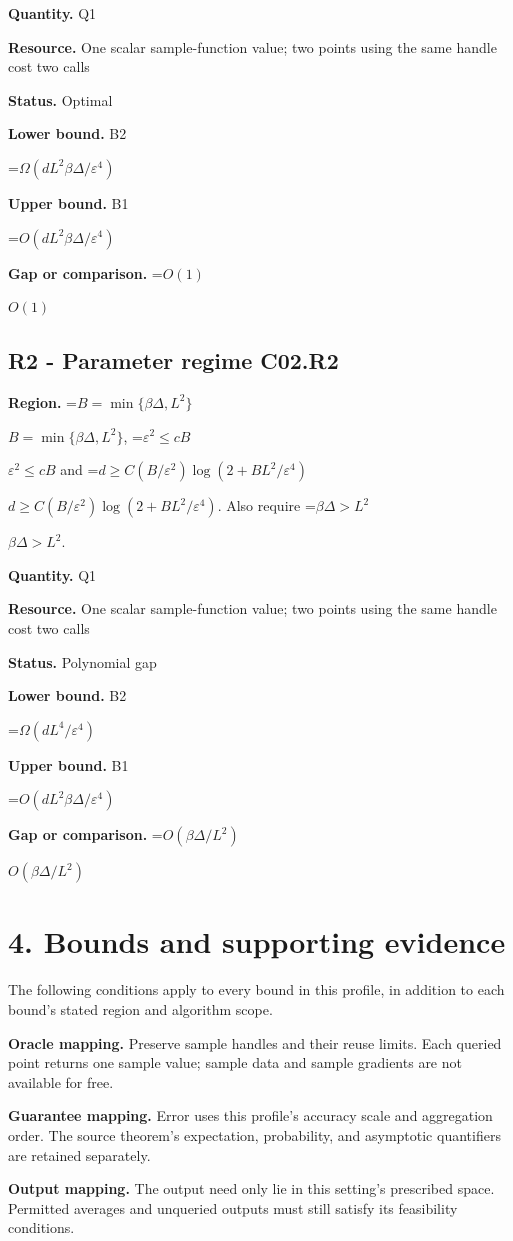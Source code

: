 \documentclass[10pt,a4paper]{article}
\newcommand{\AtlasMath}[1]{\par\begingroup\centering\setbox0=\hbox{$\displaystyle #1$}\ifdim\wd0>1.4\linewidth\typeout{ATLAS WIDE FORMULA: \the\wd0}\fi\ifdim\wd0>\linewidth\resizebox{\linewidth}{!}{\box0}\else\box0\fi\par\endgroup}
\newcommand{\AtlasInlineMath}[1]{\begingroup\setbox0=\hbox{$#1$}\ifdim\wd0>.4\linewidth\endgroup\AtlasMath{#1}\else\endgroup$#1$\fi}
\begin{document}
\textbf{Quantity.} Q1

\textbf{Resource.} One scalar sample-function value; two points using the same handle cost two calls

\textbf{Status.} Optimal

\textbf{Lower bound.} B2

\AtlasMath{\Omega(dL^2\beta\Delta/\varepsilon^4)}
\textbf{Upper bound.} B1

\AtlasMath{O(dL^2\beta\Delta/\varepsilon^4)}
\textbf{Gap or comparison.} \AtlasInlineMath{O(1)}

\subsection{R2 - Parameter regime C02.R2}
\textbf{Region.} \AtlasInlineMath{B=\min\{\beta\Delta,L^2\}}, \AtlasInlineMath{\varepsilon^2\le cB} and \AtlasInlineMath{d\ge C(B/\varepsilon^2)\log(2+BL^2/\varepsilon^4)}. Also require \AtlasInlineMath{\beta\Delta>L^2}.

\textbf{Quantity.} Q1

\textbf{Resource.} One scalar sample-function value; two points using the same handle cost two calls

\textbf{Status.} Polynomial gap

\textbf{Lower bound.} B2

\AtlasMath{\Omega(dL^4/\varepsilon^4)}
\textbf{Upper bound.} B1

\AtlasMath{O(dL^2\beta\Delta/\varepsilon^4)}
\textbf{Gap or comparison.} \AtlasInlineMath{O(\beta\Delta/L^2)}

\section{4. Bounds and supporting evidence}
The following conditions apply to every bound in this profile, in addition to each bound's stated region and algorithm scope.

\textbf{Oracle mapping.} Preserve sample handles and their reuse limits. Each queried point returns one sample value; sample data and sample gradients are not available for free.

\textbf{Guarantee mapping.} Error uses this profile's accuracy scale and aggregation order. The source theorem's expectation, probability, and asymptotic quantifiers are retained separately.

\textbf{Output mapping.} The output need only lie in this setting's prescribed space. Permitted averages and unqueried outputs must still satisfy its feasibility conditions.
\end{document}
